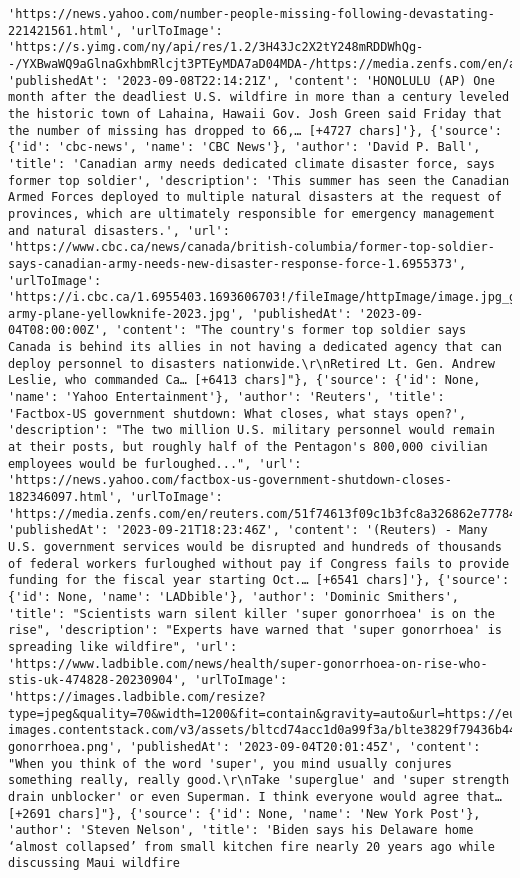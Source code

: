 \documentclass[
  letterpaper,
  DIV=11,
  numbers=noendperiod]{scrartcl}
\begin{document}
\begin{verbatim}
'https://news.yahoo.com/number-people-missing-following-devastating-221421561.html', 'urlToImage': 'https://s.yimg.com/ny/api/res/1.2/3H43Jc2X2tY248mRDDWhQg--/YXBwaWQ9aGlnaGxhbmRlcjt3PTEyMDA7aD04MDA-/https://media.zenfs.com/en/ap.org/bb0f7780900d0975be5e6546c60f8629', 'publishedAt': '2023-09-08T22:14:21Z', 'content': 'HONOLULU (AP) One month after the deadliest U.S. wildfire in more than a century leveled the historic town of Lahaina, Hawaii Gov. Josh Green said Friday that the number of missing has dropped to 66,… [+4727 chars]'}, {'source': {'id': 'cbc-news', 'name': 'CBC News'}, 'author': 'David P. Ball', 'title': 'Canadian army needs dedicated climate disaster force, says former top soldier', 'description': 'This summer has seen the Canadian Armed Forces deployed to multiple natural disasters at the request of provinces, which are ultimately responsible for emergency management and natural disasters.', 'url': 'https://www.cbc.ca/news/canada/british-columbia/former-top-soldier-says-canadian-army-needs-new-disaster-response-force-1.6955373', 'urlToImage': 'https://i.cbc.ca/1.6955403.1693606703!/fileImage/httpImage/image.jpg_gen/derivatives/16x9_620/canada-army-plane-yellowknife-2023.jpg', 'publishedAt': '2023-09-04T08:00:00Z', 'content': "The country's former top soldier says Canada is behind its allies in not having a dedicated agency that can deploy personnel to disasters nationwide.\r\nRetired Lt. Gen. Andrew Leslie, who commanded Ca… [+6413 chars]"}, {'source': {'id': None, 'name': 'Yahoo Entertainment'}, 'author': 'Reuters', 'title': 'Factbox-US government shutdown: What closes, what stays open?', 'description': "The two million U.S. military personnel would remain at their posts, but roughly half of the Pentagon's 800,000 civilian employees would be furloughed...", 'url': 'https://news.yahoo.com/factbox-us-government-shutdown-closes-182346097.html', 'urlToImage': 'https://media.zenfs.com/en/reuters.com/51f74613f09c1b3fc8a326862e777847', 'publishedAt': '2023-09-21T18:23:46Z', 'content': '(Reuters) - Many U.S. government services would be disrupted and hundreds of thousands of federal workers furloughed without pay if Congress fails to provide funding for the fiscal year starting Oct.… [+6541 chars]'}, {'source': {'id': None, 'name': 'LADbible'}, 'author': 'Dominic Smithers', 'title': "Scientists warn silent killer 'super gonorrhoea' is on the rise", 'description': "Experts have warned that 'super gonorrhoea' is spreading like wildfire", 'url': 'https://www.ladbible.com/news/health/super-gonorrhoea-on-rise-who-stis-uk-474828-20230904', 'urlToImage': 'https://images.ladbible.com/resize?type=jpeg&quality=70&width=1200&fit=contain&gravity=auto&url=https://eu-images.contentstack.com/v3/assets/bltcd74acc1d0a99f3a/blte3829f79436b449e/64f6379b61d6f67a86c1e52b/super-gonorrhoea.png', 'publishedAt': '2023-09-04T20:01:45Z', 'content': "When you think of the word 'super', you mind usually conjures something really, really good.\r\nTake 'superglue' and 'super strength drain unblocker' or even Superman. I think everyone would agree that… [+2691 chars]"}, {'source': {'id': None, 'name': 'New York Post'}, 'author': 'Steven Nelson', 'title': 'Biden says his Delaware home ‘almost collapsed’ from small kitchen fire nearly 20 years ago while discussing Maui wildfire 
\end{verbatim}
\end{document}
